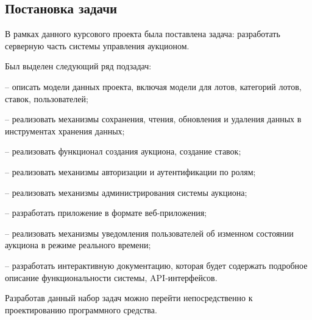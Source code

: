 
\subsection{Постановка задачи}

В рамках данного курсового проекта была поставлена задача:
разработать серверную часть системы управления аукционом.

Был выделен
следующий ряд подзадач:

– описать модели данных проекта, включая модели для лотов, категорий лотов, ставок, пользователей;

– реализовать механизмы сохранения, чтения, обновления и удаления
данных в инструментах хранения данных;

– реализовать функционал создания аукциона, создание ставок;

– реализовать механизмы авторизации и аутентификации по ролям;

– реализовать механизмы администрирования системы аукциона;

– разработать приложение в формате веб-приложения;

– реализовать механизмы уведомления пользователей об изменном состоянии аукциона в режиме реального времени;

– разработать интерактивную документацию, которая будет содержать
подробное описание функциональности системы, API-интерфейсов.

Разработав данный набор задач можно перейти непосредственно к
проектированию программного средства.